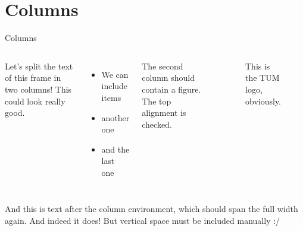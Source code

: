 \section{Columns}
\begin{frame}{Columns}
  \begin{columns}[t, onlytextwidth]
    Let's split the text of this frame in two columns! This could look
    really good.
    \begin{itemize}
      \item We can include items
      \item another one
      \item and the last one
    \end{itemize}
    The second column should contain a figure.
    The top alignment is checked.
    \begin{figure}
      \theTUMLogo[height=2cm]
      \caption{This is the TUM logo, obviously.}
    \end{figure}
  \end{columns}
  \vspace{3mm}
  And this is text after the column environment, which should span the
  full width again. And indeed it does! But vertical space must be included
  manually :/
\end{frame}
